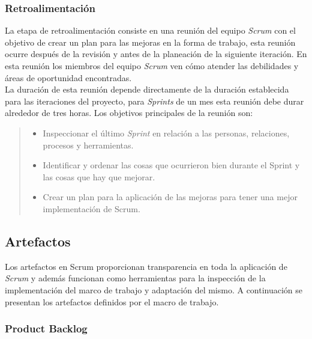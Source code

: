 \subsubsection{Retroalimentación}

 La etapa de retroalimentación consiste en una reunión del equipo {\it Scrum} con el objetivo de
 crear un plan para las mejoras en la forma de trabajo, esta reunión ocurre después de la revisión
 y antes de la planeación de la siguiente iteración. En esta reunión los miembros del equipo
 {\it Scrum} ven cómo atender las debilidades y áreas de oportunidad encontradas.\\

 \noindent La duración de esta reunión depende directamente de la duración establecida para las
 iteraciones del proyecto, para {\it Sprints} de un mes esta reunión debe durar alrededor de tres
 horas. Los objetivos principales de la reunión son:

    \begin{quote}
    \begin{itemize}
    \item Inspeccionar el último {\it Sprint} en relación a las personas, relaciones,
            procesos y herramientas.

    \item Identificar y ordenar las cosas que ocurrieron bien durante el Sprint y las
            cosas que hay que mejorar.

    \item Crear un plan para la aplicación de las mejoras para tener una mejor implementación
            de Scrum.
    \end{itemize}
    \end{quote}

\subsection{Artefactos}

 Los artefactos en Scrum proporcionan transparencia en toda la aplicación de {\it Scrum}
 y además funcionan como herramientas para la inspección de la implementación del
 marco de trabajo y adaptación del mismo. A continuación se presentan los artefactos
 definidos por el macro de trabajo.


\subsubsection{Product Backlog}

